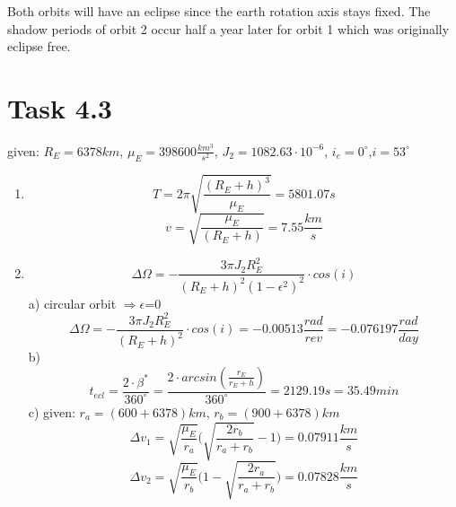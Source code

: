 \documentclass[a4paper,12pt]{article}
\begin{document}
 Both orbits will have an eclipse since the earth rotation axis stays fixed. The shadow periods of orbit 2 occur half a year later for orbit 1 which was 
 originally eclipse free.

\section*{Task 4.3}
given: $R_E = 6378km$, $\mu_E = 398600 \frac{km^3}{s^2}$, $J_2 = 1082.63\cdot 10^{-6}$, $i_e = 0^{\circ}$,$i = 53^{\circ}$
\begin{enumerate}
 \item \[T = 2\pi\sqrt{\frac{(R_E+h)^3}{\mu_E}} = 5801.07 s\]
 \[v = \sqrt{\frac{\mu_E}{(R_E + h)}} = 7.55 \frac{km}{s}\]
 \item \[\Delta \Omega = -\frac{3\pi J_2R_E^2}{(R_E +h)^2(1-\epsilon^2)^2}\cdot cos(i)\]
 a) circular orbit $\Rightarrow \epsilon$=0
 \[\Delta \Omega = -\frac{3\pi J_2R_E^2}{(R_E +h)^2}\cdot cos(i) = -0.00513 \frac{rad}{rev} = -0.076197 \frac{rad}{day}\]
 b) \[t_{ecl} = \frac{2\cdot \beta^*}{360^{\circ}} = \frac{2\cdot arcsin\left(\frac{r_E}{r_E+h}\right)}{360^{\circ}} = 2129.19s = 35.49min\]
 c) given: $r_a = (600+6378)km$, $r_b = (900+6378)km$
 \[\Delta v_1 = \sqrt{\frac{\mu_E}{r_a}}\bigg(\sqrt{\frac{2r_b}{r_a+r_b}}-1\bigg) = 0.07911\frac{km}{s}\]
 \[\Delta v_2 = \sqrt{\frac{\mu_E}{r_b}}\bigg(1-\sqrt{\frac{2r_a}{r_a+r_b}}\bigg) = 0.07828\frac{km}{s}\]
\end{enumerate}
\end{document}
